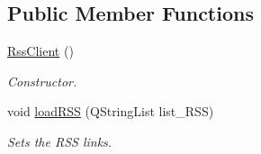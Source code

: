 \subsection*{Public Member Functions}
\begin{DoxyCompactItemize}
\item 
\hypertarget{class_rss_client_a99adb986f95f2c8b1b9201d45f4822b1}{\hyperlink{class_rss_client_a99adb986f95f2c8b1b9201d45f4822b1}{Rss\+Client} ()}\label{class_rss_client_a99adb986f95f2c8b1b9201d45f4822b1}

\begin{DoxyCompactList}\small\item\em Constructor. \end{DoxyCompactList}\item 
void \hyperlink{class_rss_client_ac47a9d917d4c52b1e90fe59b6156fa47}{load\+R\+S\+S} (Q\+String\+List list\+\_\+\+R\+S\+S)
\begin{DoxyCompactList}\small\item\em Sets the R\+S\+S links. \end{DoxyCompactList}\end{DoxyCompactItemize}
